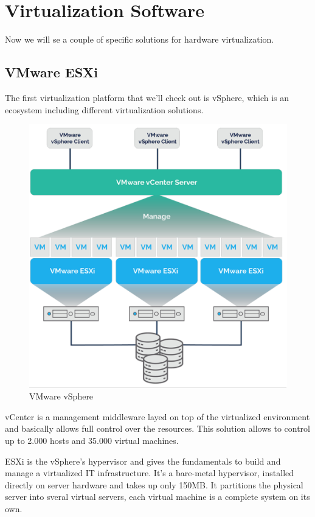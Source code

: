 \section{Virtualization Software}
Now we will se a couple of specific solutions for hardware virtualization.
\subsection{VMware ESXi}
The first virtualization platform that we'll check out is vSphere, which is an ecosystem including different virtualization solutions.
\begin{figure}
    \centering
    \includegraphics[scale=0.4]{img/ESXi.png}
    \caption{VMware vSphere}
\end{figure}
vCenter is a management middleware layed on top of the virtualized environment and basically allows full control over the resources. This solution allows to control up to 2.000 hosts and 35.000 virtual machines.

ESXi is the vSphere's hypervisor and gives the fundamentals to build and manage a virtualized IT infrastructure. It's a bare-metal hypervisor, installed directly on server hardware and takes up only 150MB. It partitions the physical server into sveral virtual servers, each virtual machine is a complete system on its own.

